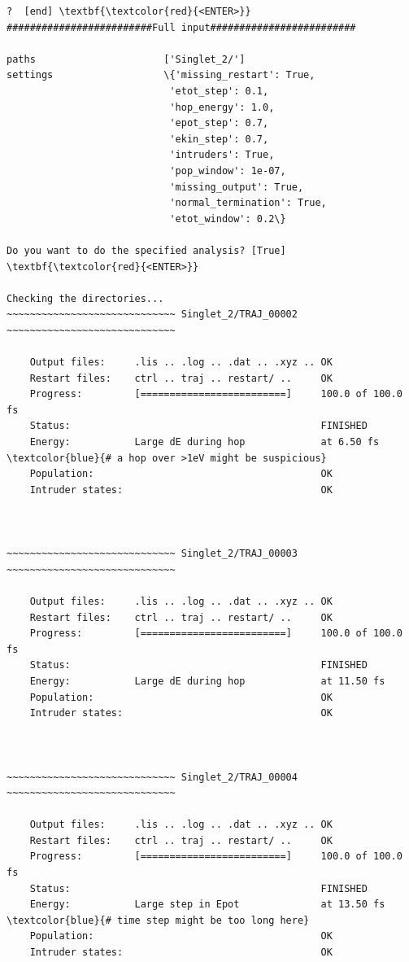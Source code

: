 \documentclass[a4paper,11pt,DIV=15,openany]{scrbook}
\begin{document}
\begin{oframed}
\begin{Verbatim}[commandchars=\\\{\}]
?  [end] \textbf{\textcolor{red}{<ENTER>}}
#########################Full input#########################

paths                      ['Singlet_2/']
settings                   \{'missing_restart': True, 
                            'etot_step': 0.1, 
                            'hop_energy': 1.0, 
                            'epot_step': 0.7, 
                            'ekin_step': 0.7, 
                            'intruders': True, 
                            'pop_window': 1e-07, 
                            'missing_output': True, 
                            'normal_termination': True, 
                            'etot_window': 0.2\}

Do you want to do the specified analysis? [True] \textbf{\textcolor{red}{<ENTER>}}

Checking the directories...
~~~~~~~~~~~~~~~~~~~~~~~~~~~~~ Singlet_2/TRAJ_00002 ~~~~~~~~~~~~~~~~~~~~~~~~~~~~~

    Output files:     .lis .. .log .. .dat .. .xyz .. OK
    Restart files:    ctrl .. traj .. restart/ ..     OK
    Progress:         [=========================]     100.0 of 100.0 fs
    Status:                                           FINISHED
    Energy:           Large dE during hop             at 6.50 fs      \textcolor{blue}{# a hop over >1eV might be suspicious}
    Population:                                       OK
    Intruder states:                                  OK



~~~~~~~~~~~~~~~~~~~~~~~~~~~~~ Singlet_2/TRAJ_00003 ~~~~~~~~~~~~~~~~~~~~~~~~~~~~~

    Output files:     .lis .. .log .. .dat .. .xyz .. OK
    Restart files:    ctrl .. traj .. restart/ ..     OK
    Progress:         [=========================]     100.0 of 100.0 fs
    Status:                                           FINISHED
    Energy:           Large dE during hop             at 11.50 fs
    Population:                                       OK
    Intruder states:                                  OK



~~~~~~~~~~~~~~~~~~~~~~~~~~~~~ Singlet_2/TRAJ_00004 ~~~~~~~~~~~~~~~~~~~~~~~~~~~~~

    Output files:     .lis .. .log .. .dat .. .xyz .. OK
    Restart files:    ctrl .. traj .. restart/ ..     OK
    Progress:         [=========================]     100.0 of 100.0 fs
    Status:                                           FINISHED
    Energy:           Large step in Epot              at 13.50 fs      \textcolor{blue}{# time step might be too long here}
    Population:                                       OK
    Intruder states:                                  OK




\end{Verbatim}
\end{oframed}
\end{document}
